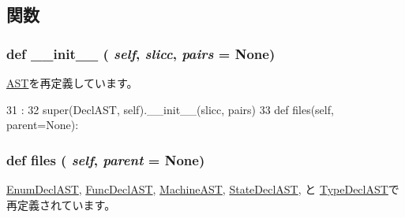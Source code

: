 \subsection{関数}
\hypertarget{classslicc_1_1ast_1_1DeclAST_1_1DeclAST_ac775ee34451fdfa742b318538164070e}{
\subsubsection[{\_\-\_\-init\_\-\_\-}]{\setlength{\rightskip}{0pt plus 5cm}def \_\-\_\-init\_\-\_\- ( {\em self}, \/   {\em slicc}, \/   {\em pairs} = {\ttfamily None})}}
\label{classslicc_1_1ast_1_1DeclAST_1_1DeclAST_ac775ee34451fdfa742b318538164070e}


\hyperlink{classslicc_1_1ast_1_1AST_1_1AST_ac775ee34451fdfa742b318538164070e}{AST}を再定義しています。


\begin{DoxyCode}
31                                            :
32         super(DeclAST, self).__init__(slicc, pairs)
33 
    def files(self, parent=None):
\end{DoxyCode}
\hypertarget{classslicc_1_1ast_1_1DeclAST_1_1DeclAST_a35b1a87f6fcbddeb5b793b0e415765f8}{
\subsubsection[{files}]{\setlength{\rightskip}{0pt plus 5cm}def files ( {\em self}, \/   {\em parent} = {\ttfamily None})}}
\label{classslicc_1_1ast_1_1DeclAST_1_1DeclAST_a35b1a87f6fcbddeb5b793b0e415765f8}


\hyperlink{classslicc_1_1ast_1_1EnumDeclAST_1_1EnumDeclAST_a35b1a87f6fcbddeb5b793b0e415765f8}{EnumDeclAST}, \hyperlink{classslicc_1_1ast_1_1FuncDeclAST_1_1FuncDeclAST_a35b1a87f6fcbddeb5b793b0e415765f8}{FuncDeclAST}, \hyperlink{classslicc_1_1ast_1_1MachineAST_1_1MachineAST_a35b1a87f6fcbddeb5b793b0e415765f8}{MachineAST}, \hyperlink{classslicc_1_1ast_1_1StateDeclAST_1_1StateDeclAST_a35b1a87f6fcbddeb5b793b0e415765f8}{StateDeclAST}, と \hyperlink{classslicc_1_1ast_1_1TypeDeclAST_1_1TypeDeclAST_a35b1a87f6fcbddeb5b793b0e415765f8}{TypeDeclAST}で再定義されています。


